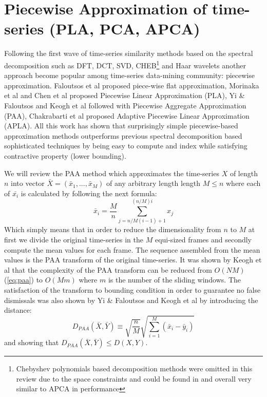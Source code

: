 \section{Piecewise Approximation of time-series (PLA, PCA, APCA)}
Following the first wave of time-series similarity methods based on the spectral decomposition such as DFT, DCT, SVD, CHEB\footnote{Chebyshev polynomials based decomposition methods were omitted in this review due to the space constraints and could be found in \cite{citeulike:2753031} and overall very similar to APCA in performance}
and Haar wavelets another approach become popular among time-series data-mining community: piecewise approximation. Faloutsos et al \cite{citeulike:4344279} proposed piece-wise flat approximation, Morinaka et al \cite{citeulike:4295248} and Chen et al \cite{citeulike:4165220} proposed Piecewise Linear Approximation (PLA), Yi \& Faloutsos \cite{citeulike:2946589} and Keogh et al \cite{citeulike:3000416} followed with Piecewise Aggregate Approximation (PAA), Chakrabarti et al \cite{citeulike:1736140} proposed Adaptive Piecewise Linear Approximation (APLA). All this work has shown that surprisingly simple piecewise-based approximation methods outperforms previous spectral decomposition based sophisticated techniques by being easy to compute and index while satisfying contractive property (lower bounding).

We will review the PAA method which approximates the time-series $X$ of length $n$ into vector $\bar{X} = ( \bar{x}_{1}, ..., \bar{x}_{M} )$ of any arbitrary length length $M \leq n$ where each of $\bar{x_{i}}$ is calculated by following the next formula:
\begin{equation}
\bar{x}_{i} = \frac{M}{n} \sum_{j=n/M(i-1)+1}^{(n/M)i} x_{j}
\label{eq:paa}
\end{equation}
Which simply means that in order to reduce the dimensionality from $n$ to $M$ at first we divide the original time-series in the $M$ equi-sized frames and secondly compute the mean values for each frame. The sequence assembled from the mean values is the PAA transform of the original time-series. It was shown by Keogh et al that the complexity of the PAA transform can be reduced from $O(NM)$ (\ref{eq:paa}) to $O(Mm)$ where $m$ is the number of the sliding windows. The satisfaction of the transform to bounding condition in order to guarantee no false dismissals was
also shown by Yi \& Faloutsos and Keogh et al by introducing the distance:
\begin{equation}
D_{PAA}(\bar{X}, \bar{Y}) \equiv \sqrt{\frac{n}{M}} \sqrt{ \sum_{i=1}^{M} 
\left(  \bar{x}_{i} - \bar{y}_{i} \right)}
\label{eq:paa_distnace}
\end{equation}
and showing that $D_{PAA}(\bar{X}, \bar{Y}) \leq D(X,Y)$.

